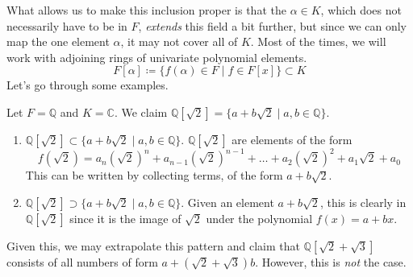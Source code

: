   What allows us to make this inclusion proper is that the $\alpha \in K$, which does not necessarily have to be in $F$, \textit{extends} this field a bit further, but since we can only map the one element $\alpha$, it may not cover all of $K$. Most of the times, we will work with adjoining rings of univariate polynomial elements. 
  \begin{equation}
    F[\alpha] \coloneqq \{ f(\alpha) \in F \mid f \in F[x]\} \subset K
  \end{equation} 
  Let's go through some examples.

  \begin{example}
    Let $F = \mathbb{Q}$ and $K = \mathbb{C}$. We claim $\mathbb{Q}[\sqrt{2}] = \{a + b \sqrt{2} \mid a, b \in \mathbb{Q} \}$.
    \begin{enumerate}
      \item $\mathbb{Q}[\sqrt{2}] \subset \{a + b \sqrt{2} \mid a, b \in \mathbb{Q} \}$. $\mathbb{Q}[\sqrt{2}]$ are elements of the form
      \begin{equation}
        f(\sqrt{2}) = a_n (\sqrt{2})^n + a_{n-1} (\sqrt{2})^{n-1} + \ldots + a_2 (\sqrt{2})^2 + a_1 \sqrt{2} + a_0
      \end{equation} 
      This can be written by collecting terms, of the form $a + b \sqrt{2}$. 

      \item $\mathbb{Q}[\sqrt{2}] \supset \{a + b \sqrt{2} \mid a, b \in \mathbb{Q} \}$. Given an element $a + b \sqrt{2}$, this is clearly in $\mathbb{Q}[\sqrt{2}]$ since it is the image of $\sqrt{2}$ under the polynomial $f(x) = a + bx$. 
    \end{enumerate}
  \end{example} 

  Given this, we may extrapolate this pattern and claim that $\mathbb{Q}[\sqrt{2} + \sqrt{3}]$ consists of all numbers of form $a + (\sqrt{2} + \sqrt{3}) b$. However, this is \textit{not} the case. 

